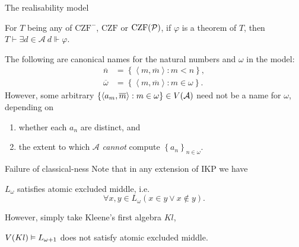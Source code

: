 \documentclass{beamer}
\newcommand\tuple[1]{\left\langle #1 \right\rangle}
\begin{document}
\begin{frame}{The realisability model}
  \begin{theorem}
    For $T$ being any of $\mathrm{CZF^-}$, $\mathrm{CZF}$ or $\mathrm{CZF}\mleft(\mathcal{P}\mright)$, if $\varphi$ is a theorem of $T$, then $T \vdash \exists d \in \mathcal{A} \ d \Vdash \varphi$.
  \end{theorem}

  \vspace{0.6em}

  The following are canonical names for the natural numbers and $\omega$ in the model:
  \begin{align*}
    \overline{n}      & = \left\{\tuple{m, \overline{m}} : m < n\right\},        \\
    \overline{\omega} & = \left\{\tuple{m, \overline{m}} : m \in \omega\right\}.
  \end{align*}
  However, some arbitrary $\left\{\tuple{a_m, \overline{m}} : m \in \omega\right\} \in V\mleft(\mathcal{A}\mright)$ need not be a name for $\omega$, depending on
  \begin{enumerate}
    \item whether each $a_n$ are distinct, and
    \item the extent to which $\mathcal{A}$ \emph{cannot} compute $\left\{a_n\right\}_{n \in \omega}$.
  \end{enumerate}
\end{frame}

\begin{frame}{Failure of classical-ness}
  Note that in any extension of $\mathrm{IKP}$ we have
  \begin{theorem}
    $L_\omega$ satisfies atomic excluded middle, i.e.
    \[\forall x, y \in L_\omega \left(x \in y \lor x \not\in y\right).\]
  \end{theorem}


  \pause

  However, simply take Kleene's first algebra $Kl$,
  \begin{theorem}
    $V\mleft(Kl\mright) \vDash L_{\omega + 1}$ does not satisfy atomic excluded middle.
  \end{theorem}

\end{frame}
\end{document}
